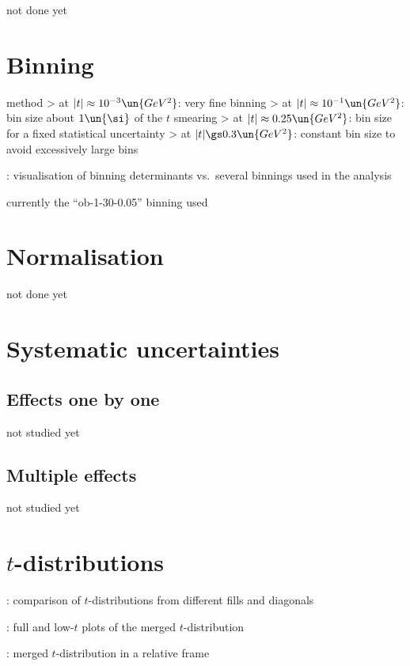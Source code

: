 \> not done yet



\section{Binning}

\> method
\>> at $|t| \approx 10^{-3}\un{GeV^2}$: very fine binning
\>> at $|t| \approx 10^{-1}\un{GeV^2}$: bin size about $1\un{\si}$ of the $t$ smearing
\>> at $|t| \approx 0.25\un{GeV^2}$: bin size for a fixed statistical uncertainty
\>> at $|t| \gs 0.3\un{GeV^2}$: constant bin size to avoid excessively large bins

\>  : visualisation of binning determinants vs.~several binnings used in
the analysis

\> currently the ``ob-1-30-0.05'' binning used



\section{Normalisation}

\> not done yet


\section{Systematic uncertainties}

\subsection{Effects one by one}

\> not studied yet

\subsection{Multiple effects}

\> not studied yet


\section{$t$-distributions}

\> : comparison of $t$-distributions from different fills and diagonals

\> : full and low-$t$ plots of the merged $t$-distribution

\> : merged $t$-distribution in a relative frame



\bye
